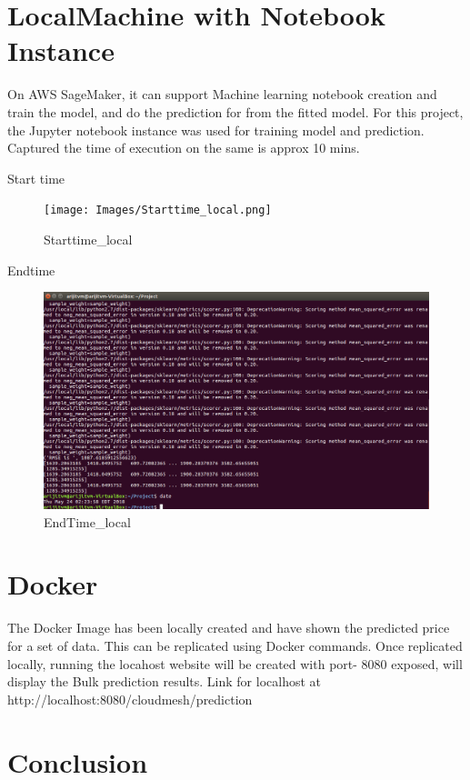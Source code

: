 \section{LocalMachine with Notebook Instance}

On AWS SageMaker, it can support Machine learning notebook creation and 
train the model, and do the prediction for from the fitted model. For this 
project, the Jupyter notebook instance was used for training model and 
prediction. Captured the time of execution on the same is approx 10 mins.

Start time
\begin{figure}[pic11]
\centering
\texttt{[image: Images/Starttime\_local.png]}
\caption{Starttime_local}\label{fig:Starttime_local}
\end{figure}

Endtime 
\begin{figure}[pic12]
\centering
\includegraphics[width=\columnwidth]{Images/EndTime_local.png}
\caption{EndTime_local}\label{fig:EndTime_local}
\end{figure}

\section{Docker}

The Docker Image has been locally created and have shown the predicted 
price for a set of data. This can be replicated using Docker commands. 
Once replicated locally, running the locahost website will be created 
with port- 8080 exposed, will display the Bulk prediction results.
Link for localhost at http://localhost:8080/cloudmesh/prediction

\section{Conclusion}

